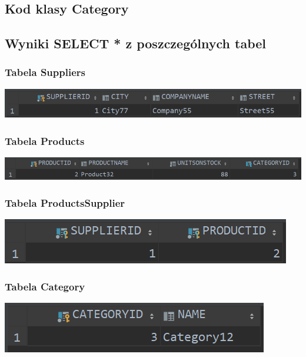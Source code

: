 \documentclass[a4paper, 11pt]{article}
\begin{document}
    \newpage

    \subsection{Kod klasy Category}
    

    \newpage

    \subsection{Wyniki SELECT * z poszczególnych tabel}
    \subsubsection{Tabela Suppliers}
    \begin{center}
        \includegraphics{images/point6/SelectSuppliers.png}
    \end{center}

    \subsubsection{Tabela Products}
    \begin{center}
        \includegraphics[scale=0.85]{images/point6/SelectProducts.png}
    \end{center}

    \subsubsection{Tabela ProductsSupplier}
    \begin{center}
        \includegraphics{images/point6/SelectProductsSupplier.png}
    \end{center}

    \subsubsection{Tabela Category}
    \begin{center}
        \includegraphics{images/point6/SelectCategories.png}
    \end{center}
\end{document}
